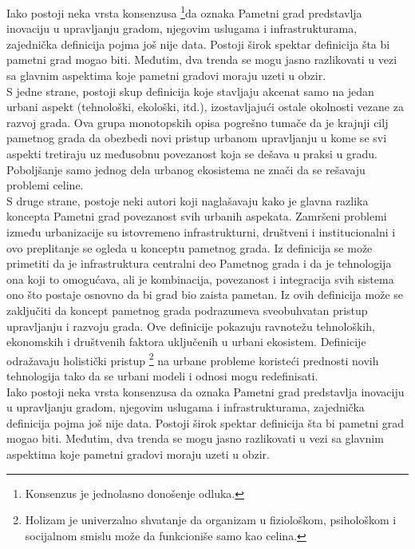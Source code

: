 \documentclass[a4paper,12pt]{article}
\begin{document}
{Iako postoji neka vrsta konsenzusa \footnote{Konsenzus je jednolasno donošenje odluka.}da oznaka Pametni grad predstavlja inovaciju u upravljanju gradom, njegovim uslugama i infrastrukturama, zajednička definicija pojma još nije data. Postoji širok spektar definicija šta bi pametni grad mogao biti. Međutim, dva trenda se mogu jasno razlikovati u vezi sa glavnim aspektima koje pametni gradovi moraju uzeti u obzir. \\

S jedne strane, postoji skup definicija koje stavljaju akcenat samo na jedan urbani aspekt (tehnološki, ekološki, itd.), izostavljajući ostale okolnosti vezane za razvoj grada. Ova grupa monotopskih opisa pogrešno tumače da je krajnji cilj pametnog grada da obezbedi novi pristup urbanom upravljanju u kome se svi aspekti tretiraju uz međusobnu povezanost koja se dešava u praksi u gradu. Poboljšanje samo jednog dela urbanog ekosistema ne znači da se rešavaju problemi celine. \\

S druge strane, postoje neki autori koji naglašavaju kako je glavna razlika koncepta Pametni grad povezanost svih urbanih aspekata. Zamršeni problemi između urbanizacije su istovremeno infrastrukturni, društveni i institucionalni i ovo preplitanje se ogleda u konceptu pametnog grada. Iz definicija se može primetiti da je infrastruktura centralni deo Pametnog grada i da je tehnologija ona koji to omogućava, ali je kombinacija, povezanost i integracija svih sistema ono što postaje osnovno da bi grad bio zaista pametan. Iz ovih definicija može se zaključiti da koncept pametnog grada podrazumeva sveobuhvatan pristup upravljanju i razvoju grada. Ove definicije pokazuju ravnotežu tehnoloških, ekonomskih i društvenih faktora uključenih u urbani ekosistem. Definicije odražavaju holistički pristup \footnote{Holizam je univerzalno shvatanje da organizam u fiziološkom, psihološkom i socijalnom smislu može da funkcioniše samo kao celina. 
} na urbane probleme koristeći prednosti novih tehnologija tako da se urbani modeli i odnosi mogu redefinisati.\\

Iako postoji neka vrsta konsenzusa da oznaka Pametni grad predstavlja inovaciju u upravljanju gradom, njegovim uslugama i infrastrukturama, zajednička definicija pojma još nije data. Postoji širok spektar definicija šta bi pametni grad mogao biti. Međutim, dva trenda se mogu jasno razlikovati u vezi sa glavnim aspektima koje pametni gradovi moraju uzeti u obzir. \\

}
\end{document}
